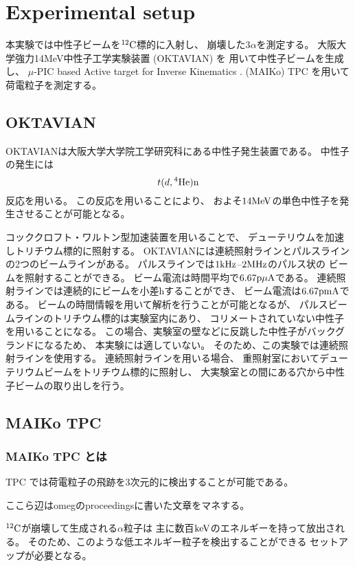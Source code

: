 \chapter{Experimental setup}
本実験では中性子ビームを${}^{12}\rm{C}$標的に入射し、
崩壊した3$\alpha$を測定する。
大阪大学強力14MeV中性子工学実験装置 (OKTAVIAN) を
用いて中性子ビームを生成し、
$\mu$-PIC based Active target for Inverse Kinematics .
(MAIKo) TPC を用いて荷電粒子を測定する。
\section{OKTAVIAN}
OKTAVIANは大阪大学大学院工学研究科にある中性子発生装置である。
中性子の発生には
\begin{equation}
  t(d,{}^{4}\rm{He})n
\end{equation}
反応を用いる。
この反応を用いることにより、
およそ$14\rm{MeV}$の単色中性子を発生させることが可能となる。

コッククロフト・ワルトン型加速装置を用いることで、
デューテリウムを加速しトリチウム標的に照射する。
OKTAVIANには連続照射ラインとパルスラインの2つのビームラインがある。
パルスラインでは$1\rm{kHz}$--$2\rm{MHz}$のパルス状の
ビームを照射することができる。
ビーム電流は時間平均で$6.67\rm{p\mu A}$である。
連続照射ラインでは連続的にビームを小差hすることができ、
ビーム電流は$6.67\rm{pmA}$である。
ビームの時間情報を用いて解析を行うことが可能となるが、
パルスビームラインのトリチウム標的は実験室内にあり、
コリメートされていない中性子を用いることになる。
この場合、実験室の壁などに反跳した中性子がバックグランドになるため、
本実験には適していない。
そのため、この実験では連続照射ラインを使用する。
連続照射ラインを用いる場合、
重照射室においてデューテリウムビームをトリチウム標的に照射し、
大実験室との間にある穴から中性子ビームの取り出しを行う。


\section{MAIKo TPC}
\subsection{MAIKo TPC とは}
TPC では荷電粒子の飛跡を3次元的に検出することが可能である。

ここら辺はomegのproceedingsに書いた文章をマネする。

${}^{12}\rm{C}$が崩壊して生成される$\alpha$粒子は
主に数百$\rm{keV}$のエネルギーを持って放出される。
そのため、このような低エネルギー粒子を検出することができる
セットアップが必要となる。

